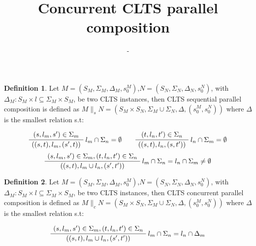 \documentclass{article}
\title{Concurrent CLTS parallel composition} %
\author{-} %
\date{}
\theoremstyle{definition}
\newtheorem{definition}{Definition}[section]
\newcommand{\automaton}[1]{$#1 = (S_{#1}, \Sigma_{#1}, \Delta_{#1}, s_{0}^{#1})$}
\newcommand{\ltsComposition}[3]{$#1 \parallel_{#3} #2 = (S_{#1}\times S_{#2}, \Sigma_{#1} \cup \Sigma_{#2}, \Delta, (s_{0}^{#1},s_{0}^{#2}))$}
\begin{document}
\maketitle

\setcounter{section}{1} %
\setcounter{theorem}{1} %

\begin{definition} 
Let \automaton{M},\automaton{N}, with $\Delta_M : S_M \times l \subseteq \Sigma_M \times S_M$, be two CLTS instances, then CLTS sequential parallel composition is defined as \ltsComposition{M}{N}{s} where $\Delta$ is the smallest relation s.t:
\begin{center}
	\begin{equation}
		\AxiomC{$(s, l_m, s') \in \Sigma_m $}\RightLabel{$l_m \cap \Sigma_n = \emptyset$}
		\UnaryInfC{$((s,t),l_m,(s',t))$}
		\DisplayProof
		\quad\quad
		\AxiomC{$(t, l_n, t') \in \Sigma_n $}\RightLabel{$l_n \cap \Sigma_m = \emptyset$}
		\UnaryInfC{$((s,t),l_n,(s,t'))$}
		\DisplayProof
	\end{equation}
	\begin{equation}
		\AxiomC{$(s, l_m, s') \in \Sigma_m,(t, l_n, t') \in \Sigma_n  $}\RightLabel{$l_m \cap \Sigma_n = l_n \cap \Sigma_m \neq \emptyset$}
		\UnaryInfC{$((s,t),l_m \cup l_n,(s',t'))$}
		\DisplayProof
	\end{equation}	
\end{center}
\end{definition}
\begin{definition} 
	Let \automaton{M},\automaton{N}, with $\Delta_M : S_M \times l \subseteq \Sigma_M \times S_M$, be two CLTS instances, then CLTS concurrent parallel composition is defined as \ltsComposition{M}{N}{c} where $\Delta$ is the smallest relation s.t:
	\begin{center}
		\begin{equation}
		\AxiomC{$(s, l_m, s') \in \Sigma_m,(t, l_n, t') \in \Sigma_n  $}\RightLabel{$l_m \cap \Sigma_n = l_n \cap \Delta_m$}
		\UnaryInfC{$((s,t),l_m \cup l_n,(s',t'))$}
		\DisplayProof
		\end{equation}	
	\end{center}
\end{definition}
\end{document}
